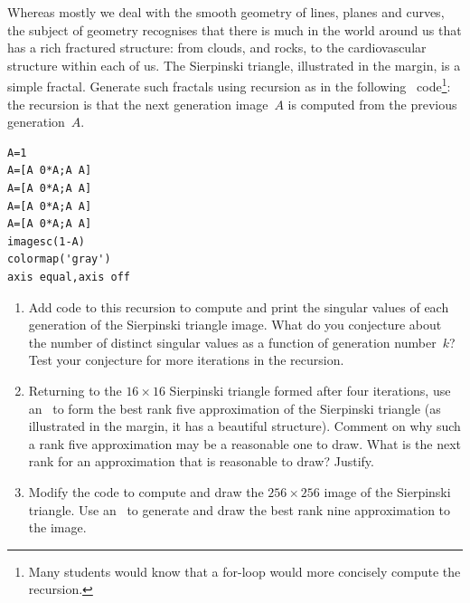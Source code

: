 \begin{exercise} \label{ex:siertri} 
Whereas mostly we deal with the smooth geometry of lines, planes and curves, 
the subject of  geometry recognises that there is much in the world around us that has a rich fractured structure: from clouds, and rocks, to the cardiovascular structure within each of us.
\marginpar{}
The Sierpinski triangle, illustrated in the margin, is a simple fractal.
Generate such fractals using recursion as in the following \script\ code\footnote{Many students would know that a for-loop would more concisely compute the recursion.}:
the recursion is that the next generation image~\(A\) is computed from the previous generation~\(A\).
\begin{verbatim}
A=1
A=[A 0*A;A A]
A=[A 0*A;A A]
A=[A 0*A;A A]
A=[A 0*A;A A]
imagesc(1-A)
colormap('gray')
axis equal,axis off
\end{verbatim}
\setbox\ajrqrbox\hbox{}%
\marginpar{\usebox{\ajrqrbox\\[2ex]}}%
\begin{enumerate}
\item Add code to this recursion to compute and print the singular values of each generation of the Sierpinski triangle image.
What do you conjecture about the number of distinct singular values as a function of generation number~\(k\)?
Test your conjecture for more iterations in the recursion.

\item Returning to the \(16\times16\) Sierpinski triangle formed after four iterations, use an \svd\ to form the best rank five approximation of the Sierpinski triangle (as illustrated in the margin, it has a beautiful structure).  
\marginpar{}
Comment on why such a rank five approximation may be a reasonable one to draw.  
What is the next rank for an approximation that is reasonable to draw?  Justify.

\item Modify the code to compute and draw the \(256\times256\) image of the Sierpinski triangle.
Use an \svd\ to generate and draw the best rank nine approximation to the image.
\end{enumerate}
\end{exercise}



